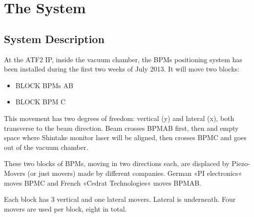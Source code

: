 \chapter{The System}
\section{System Description}
At the ATF2 IP, inside the vacuum chamber, the BPMs positioning system has been installed during the first two weeks of July 2013.
It will move two blocks:
\begin{itemize}
\item BLOCK BPMs AB
\item BLOCK BPM C
\end{itemize}
This movement has two degrees of freedom: vertical (y) and lateral (x), both transverse to the beam direction. Beam crosses BPMAB first, then and empty space where Shintake monitor laser will be aligned, then crosses BPMC and goes out of the vacuum chamber.

These two blocks of BPMs, moving in two directions each, are displaced by Piezo-Movers (or just movers) made by different companies. German «PI electronics« moves  BPMC and French «Cedrat Technologies« moves BPMAB.

Each block has 3 vertical and one lateral movers. Lateral is underneath. Four movers are used per block, eight in total.

